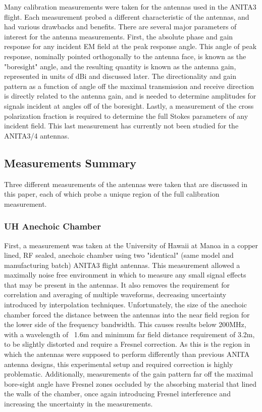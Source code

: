 	Many calibration measurements were taken for the antennas used in the ANITA3 flight.  Each measurement probed a different characteristic of the antennas, and had various drawbacks and benefits.  There are several major parameters of interest for the antenna measurements. First, the absolute phase and gain response for any incident EM field at the peak response angle.  This angle of peak response, nominally pointed orthogonally to the antenna face, is known as the "boresight" angle, and the resulting quantity is known as the antenna gain, represented in units of dBi and discussed later. The directionality and gain pattern as a function of angle off the maximal transmission and receive direction is directly related to the antenna gain, and is needed to determine amplitudes for signals incident at angles off of the boresight.   Lastly, a measurement of the cross polarization fraction is required to determine the full Stokes parameters of any incident field.  This last measurement has currently not been studied for the ANITA3/4 antennas.
	
	\subsection{Measurements Summary}
	
	Three different measurements of the antennas were taken that are discussed in this paper, each of which probe a unique region of the full calibration measurement.  
	
		\subsubsection{UH Anechoic Chamber}
		First, a measurement was taken at the University of Hawaii at Manoa in a copper lined, RF sealed, anechoic chamber using two "identical" (same model and manufacturing batch) ANITA3 flight antennas.  This measurement allowed a maximally noise free environment in which to measure any small signal effects that may be present in the antennas.  It also removes the requirement for correlation and averaging of multiple waveforms, decreasing uncertainty introduced by interpolation techniques.  Unfortunately, the size of the anechoic chamber forced the distance between the antennas into the near field region for the lower side of the frequency bandwidth.  This causes results below 200MHz, with a wavelength of ~1.6m and minimum far field distance requirement of 3.2m, to be slightly distorted and require a 	Fresnel correction. As this is the region in which the antennas were supposed to perform differently than previous ANITA antenna designs, this experimental setup and required correction is highly problematic.  Additionally, measurements of the gain pattern far off the maximal bore-sight angle have Fresnel zones occluded by the absorbing material that lined the walls of the chamber, once again introducing Fresnel interference and increasing the uncertainty in the measurements.
	
